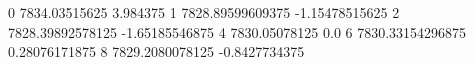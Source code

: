 0 7834.03515625 3.984375
1 7828.89599609375 -1.15478515625
2 7828.39892578125 -1.65185546875
4 7830.05078125 0.0
6 7830.33154296875 0.28076171875
8 7829.2080078125 -0.8427734375
